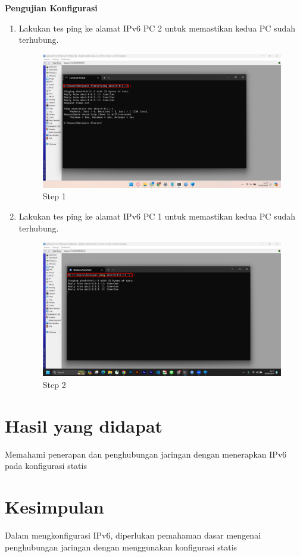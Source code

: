 \begin{center}
	\textbf{Pengujian Konfigurasi}
	\begin{enumerate}
		\item Lakukan tes ping ke alamat IPv6 PC 2 untuk memastikan kedua PC sudah terhubung.
		\begin{figure}[H]
			\centering
			\includegraphics[width=0.8\linewidth]{P5/img/pc1/Step 8.png}
			\caption{Step 1}
			\label{fig:Ping Step 1}
		\end{figure}
        \item Lakukan tes ping ke alamat IPv6 PC 1 untuk memastikan kedua PC sudah terhubung.
		\begin{figure}[H]
			\centering
			\includegraphics[width=0.8\linewidth]{P5/img/pc2/Step 8.png}
			\caption{Step 2}
			\label{fig:Ping Step 2}
		\end{figure}
	\end{enumerate}

\end{center}

\section{Hasil yang didapat}
Memahami penerapan dan penghubungan jaringan dengan menerapkan IPv6 pada konfigurasi statis

\section{Kesimpulan}
Dalam mengkonfigurasi IPv6, diperlukan pemahaman dasar mengenai penghubungan jaringan dengan menggunakan konfigurasi statis
